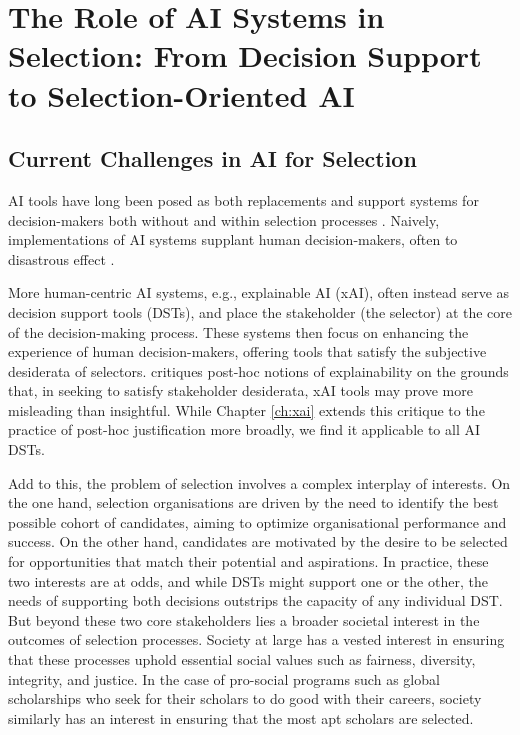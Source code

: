 \section[The Role of AI Systems in Selection]{The Role of AI Systems in Selection: From Decision Support to Selection-Oriented AI}
\subsection{Current Challenges in AI for Selection}
AI tools have long been posed as both replacements and support systems for decision-makers both without and within selection processes \cite{barocas_big_2016,jacobs_how_2021,hildebrandt_law_nodate,yarger2020algorithmic,mattu_how_nodate}. Naively, implementations of AI systems supplant human decision-makers, often to disastrous effect \cite{mattu_how_nodate}.

More human-centric AI systems, e.g., explainable AI (xAI), often instead serve as decision support tools (DSTs), and place the stakeholder (the selector) at the core of the decision-making process. These systems then focus on enhancing the experience of human decision-makers, offering tools that satisfy the subjective desiderata of selectors. \textcite{Lipton} critiques post-hoc notions of explainability on the grounds that, in seeking to satisfy stakeholder desiderata, xAI tools may prove more misleading than insightful. While Chapter \ref{ch:xai} extends this critique to the practice of post-hoc justification more broadly, we find it applicable to all AI DSTs.

Add to this, the problem of selection involves a complex interplay of interests. On the one hand, selection organisations are driven by the need to identify the best possible cohort of candidates, aiming to optimize organisational performance and success. On the other hand, candidates are motivated by the desire to be selected for opportunities that match their potential and aspirations. In practice, these two interests are at odds, and while DSTs might support one or the other, the needs of supporting both decisions outstrips the capacity of any individual DST. But beyond these two core stakeholders lies a broader societal interest in the outcomes of selection processes. Society at large has a vested interest in ensuring that these processes uphold essential social values such as fairness, diversity, integrity, and justice. In the case of pro-social programs such as global scholarships who seek for their scholars to do good with their careers, society similarly has an interest in ensuring that the most apt scholars are selected.

